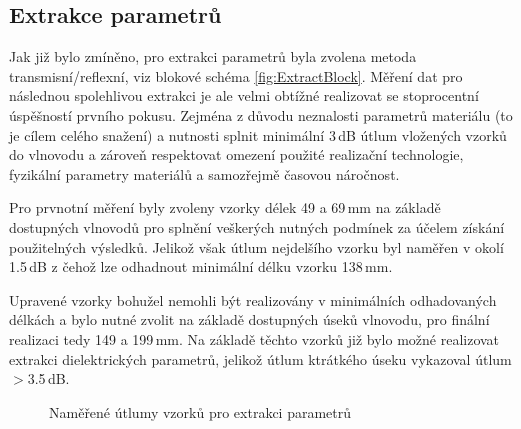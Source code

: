 \subsection{Extrakce parametrů}
Jak již bylo zmíněno, pro extrakci parametrů byla zvolena metoda transmisní/reflexní, viz blokové schéma \ref{fig:ExtractBlock}. Měření dat pro následnou spolehlivou extrakci je ale velmi obtížné realizovat se stoprocentní úspěšností prvního pokusu. Zejména z důvodu neznalosti parametrů materiálu (to je cílem celého snažení) a nutnosti splnit minimální 3\,dB útlum vložených vzorků do vlnovodu a zároveň respektovat omezení použité realizační technologie, fyzikální parametry materiálů a samozřejmě časovou náročnost.

Pro prvnotní měření byly zvoleny vzorky délek 49 a 69\,mm na základě dostupných vlnovodů pro splnění veškerých nutných podmínek za účelem získání použitelných výsledků. Jelikož však útlum nejdelšího vzorku byl naměřen v okolí 1.5\,dB z čehož lze odhadnout minimální délku vzorku 138\,mm. 

Upravené vzorky bohužel nemohli být realizovány v minimálních odhadovaných délkách a bylo nutné zvolit na základě dostupných úseků vlnovodu, pro finální realizaci tedy 149 a 199\,mm. Na základě těchto vzorků již bylo možné realizovat extrakci dielektrických parametrů, jelikož útlum ktrátkého úseku vykazoval útlum $>$3.5\,dB.

\begin{figure}
\label{fig:Attmeasure}
\caption{Naměřené útlumy vzorků pro extrakci parametrů}
\end{figure}

